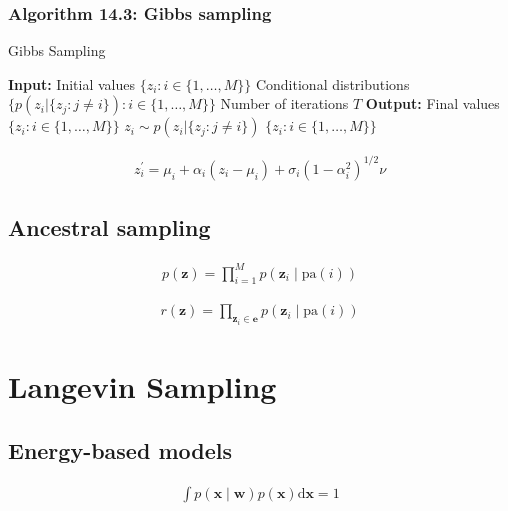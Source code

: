 \documentclass{article}
\begin{document}
\subsubsection{Algorithm 14.3: Gibbs sampling}

\begin{algorithm}[H]
\caption{Gibbs Sampling}
\begin{algorithmic}[1]
\STATE \textbf{Input:} Initial values $\{z_i : i \in \{1, \ldots, M\}\}$
\STATE \quad Conditional distributions $\{p(z_i | \{z_j : j \neq i\}) : i \in \{1, \ldots, M\}\}$
\STATE \quad Number of iterations $T$
\STATE \textbf{Output:} Final values $\{z_i : i \in \{1, \ldots, M\}\}$
        \STATE $z_i \sim p(z_i | \{z_j : j \neq i\})$
    \ENDFOR
\ENDFOR
\RETURN $\{z_i : i \in \{1, \ldots, M\}\}$
\end{algorithmic}
\end{algorithm}

\begin{align*}
z_{i}^{\prime}=\mu_{i}+\alpha_{i}\left(z_{i}-\mu_{i}\right)+\sigma_{i}\left(1-\alpha_{i}^{2}\right)^{1 / 2} \nu \tag{14.46}
\end{align*}

\subsection{Ancestral sampling}

\begin{align*}
p(\mathbf{z})=\prod_{i=1}^{M} p\left(\mathbf{z}_{i} \mid \mathrm{pa}(i)\right) \tag{14.47}
\end{align*}

\begin{align*}
r(\mathbf{z})=\prod_{\mathbf{z}_{i} \in \mathbf{e}} p\left(\mathbf{z}_{i} \mid \mathrm{pa}(i)\right) \tag{14.48}
\end{align*}

\section{Langevin Sampling}

\subsection{Energy-based models}

\begin{align*}
\int p(\mathbf{x} \mid \mathbf{w}) p(\mathbf{x}) \mathrm{d} \mathbf{x}=1 \tag{14.49}
\end{align*}
\end{document}
